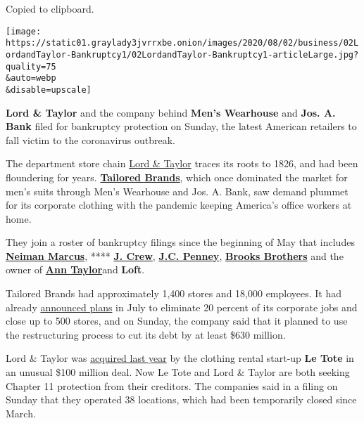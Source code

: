 Copied to clipboard.

\texttt{[image: https://static01.graylady3jvrrxbe.onion/images/2020/08/02/business/02LordandTaylor-Bankruptcy1/02LordandTaylor-Bankruptcy1-articleLarge.jpg?quality=75\\\&auto=webp\\\&disable=upscale]}

\textbf{Lord \& Taylor} and the company behind \textbf{Men's Wearhouse}
and \textbf{Jos. A. Bank} filed for bankruptcy protection on Sunday, the
latest American retailers to fall victim to the coronavirus outbreak.

The department store chain
\href{https://www.nytimes3xbfgragh.onion/2020/08/02/business/Lord-and-Taylor-Bankruptcy.html}{Lord
\& Taylor} traces its roots to 1826, and had been floundering for years.
\textbf{\href{https://www.nytimes3xbfgragh.onion/2020/08/03/business/tailored-brands-mens-wearhouse-bankruptcy.html}{Tailored
Brands}}\href{https://www.nytimes3xbfgragh.onion/2020/08/03/business/tailored-brands-mens-wearhouse-bankruptcy.html}{,}
which once dominated the market for men's suits through Men's Wearhouse
and Jos. A. Bank, saw demand plummet for its corporate clothing with the
pandemic keeping America's office workers at home.

They join a roster of bankruptcy filings since the beginning of May that
includes
\textbf{\href{https://www.nytimes3xbfgragh.onion/2020/05/07/business/neiman-marcus-bankruptcy.html}{Neiman
Marcus}}, ****
\textbf{\href{https://www.nytimes3xbfgragh.onion/2020/05/03/business/j-crew-bankruptcy-coronavirus.html}{J.
Crew}},
\textbf{\href{https://www.nytimes3xbfgragh.onion/2020/05/15/business/jc-penney-bankruptcy-coronavirus.html}{J.C.
Penney}},
\textbf{\href{https://www.nytimes3xbfgragh.onion/2020/07/08/business/brooks-brothers-chapter-11-bankruptcy.html}{Brooks
Brothers}} and the owner of
\textbf{\href{https://www.nytimes3xbfgragh.onion/2020/07/23/business/ascena-bankruptcy-ann-taylor-lane-bryant.html}{Ann
Taylor}}\href{https://www.nytimes3xbfgragh.onion/2020/07/23/business/ascena-bankruptcy-ann-taylor-lane-bryant.html}{}and
\textbf{Loft}.

Tailored Brands had approximately 1,400 stores and 18,000 employees. It
had already
\href{https://www.businesswire.com/news/home/20200721005319/en/Tailored-Brands-Announces-Plans-Reduce-Headcount-Close}{announced
plans} in July to eliminate 20 percent of its corporate jobs and close
up to 500 stores, and on Sunday, the company said that it planned to use
the restructuring process to cut its debt by at least \$630 million.

Lord \& Taylor was
\href{https://www.nytimes3xbfgragh.onion/2019/08/28/business/lord-taylor-sold-le-tote.html}{acquired
last year} by the clothing rental start-up \textbf{Le Tote} in an
unusual \$100 million deal. Now Le Tote and Lord \& Taylor are both
seeking Chapter 11 protection from their creditors. The companies said
in a filing on Sunday that they operated 38 locations, which had been
temporarily closed since March.

